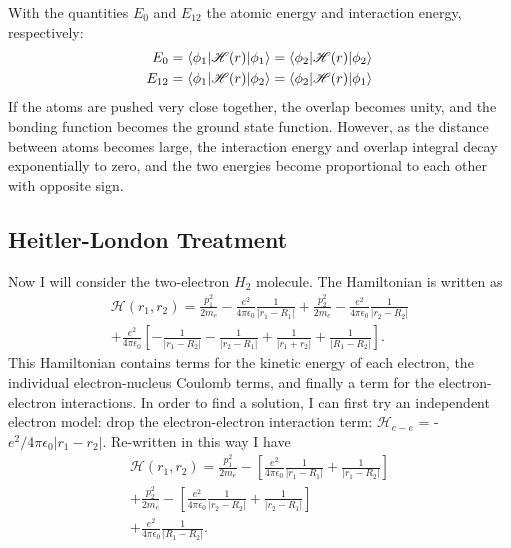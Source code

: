With the quantities $E_0$ and $E_{12}$ the atomic energy and interaction energy, respectively:
\begin{eqnarray}
E_0=\braket{\phi_1|\mathscr{H}(r)|\phi_1} =\braket{\phi_2|\mathscr{H}(r)|\phi_2}\\
E_{12}=\braket{\phi_1|\mathscr{H}(r)|\phi_2} =\braket{\phi_2|\mathscr{H}(r)|\phi_1}
\end{eqnarray}
If the atoms are pushed very close together, the overlap becomes unity, and the bonding function becomes the ground state function. However, as the distance between atoms becomes large, the interaction energy and overlap integral decay exponentially to zero, and the two energies become proportional to each other with opposite sign. 

\subsection{Heitler-London Treatment}

Now I will consider the two-electron $H_2$ molecule. The Hamiltonian is written as
\begin{equation}
\begin{split}
\mathscr{H}(r_1,r_2) = \frac{p^2_1}{2m_e}-\frac{e^2}{4\pi\epsilon_0}\frac{1}{|r_1-R_1|}+\frac{p_2^2}{2m_e}-\frac{e^2}{4\pi\epsilon_0}\frac{1}{|r_2-R_2|} \\
+\frac{e^2}{4\pi\epsilon_0}\left[-\frac{1}{|r_1-R_2|}-\frac{1}{|r_2-R_1|}+\frac{1}{|r_1+r_2|}+\frac{1}{|R_1-R_2|}\right].
\label{HLHamiltonian}
\end{split}
\end{equation}
This Hamiltonian contains terms for the kinetic energy of each electron, the individual electron-nucleus Coulomb terms, and finally a term for the electron-electron  interactions. In order to find a solution, I can first try  an independent electron model: drop the electron-electron interaction term: $\mathscr{H}_{e-e}$ = -$e^2/4\pi\epsilon_0|r_1-r_2|$. Re-written in this way I have
\begin{equation}
\begin{split}
\mathscr{H}(r_1,r_2)=\frac{p_1^2}{2m_e}-\left[\frac{e^2}{4\pi\epsilon_0}\frac{1}{|r_1-R_1|}+\frac{1}{|r_1-R_2|}\right] \\
+\frac{p_2^2}{2m_e}-\left[\frac{e^2}{4\pi\epsilon_0}\frac{1}{|r_2-R_2|}+\frac{1}{|r_2-R_1|}\right] \\
+\frac{e^2}{4\pi\epsilon_0}\frac{1}{|R_1-R_2|}.
\label{IndepElecHamiltonian}
\end{split}
\end{equation}


